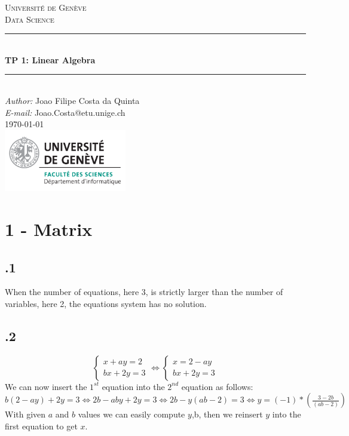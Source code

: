 \documentclass[a4paper]{article}
\makeatletter
\newcommand\TPid{1}
\newcommand\TPname{Linear Algebra}
\newcommand\Firstname{Joao Filipe}
\newcommand\Familyname{Costa da Quinta}
\newcommand\Email{Joao.Costa@etu.unige.ch}
\makeatother
\begin{document}
\begin{titlepage}

\newcommand{\HRule}{\rule{\linewidth}{0.5mm}} 							%

\center 
 
\textsc{\LARGE Université de Genève}\\[1cm]

\textsc{\Large Data Science}\\[0.2cm]									%
\HRule \\[0.8cm]
{ \huge \bfseries TP \TPid : \TPname}\\[0.7cm]								%
\HRule \\[2cm]
\large
\emph{Author:} \Firstname \; \Familyname\\[0.5cm]		
\emph{E-mail:} {\color{blue}\Email}\\[7cm]		
{\large \today}\\[2cm]
\includegraphics[width=0.4\textwidth]{images/unige_csd.png}\\[1cm] 	%
\vfill 
\end{titlepage}


\newpage
\section*{1 - Matrix}
\subsection*{.1}
When the number of equations, here 3, is strictly larger than the number of variables, here 2, the equations system has no solution.
\subsection*{.2}
$$\begin{cases}x + ay = 2\\ bx + 2y = 3\end{cases} \Leftrightarrow \begin{cases}x = 2 - ay\\ bx + 2y = 3\end{cases}$$
We can now insert the $1^{st}$ equation into the $2^{nd}$ equation as follows:\\
$b(2 - ay) + 2y = 3 \Leftrightarrow 2b - aby + 2y = 3 \Leftrightarrow 2b - y(ab -2) = 3 \Leftrightarrow y = (-1) * \left( \frac{3 - 2b}{(ab - 2)} \right) $\\
With given $a$ and $b$ values we can easily compute $y$,b, then we reinsert $y$ into the first equation to get $x$.
\end{document}
